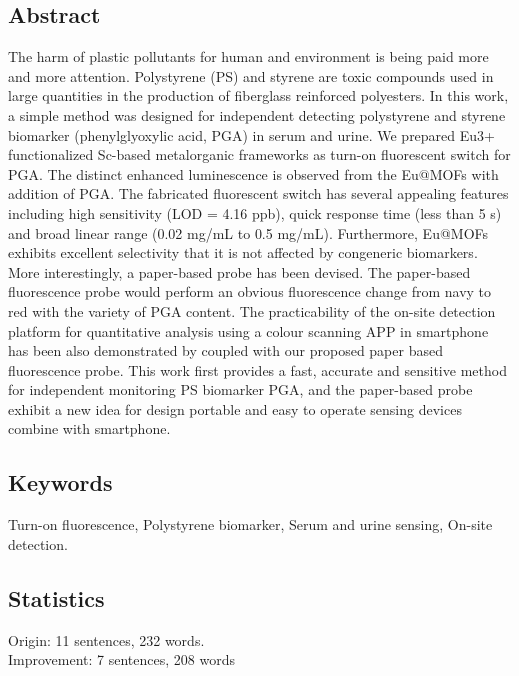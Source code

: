 \documentclass{article}
\begin{document}
\subsection{Abstract}
The harm of plastic pollutants for human and environment is being paid more and 
more attention. 
Polystyrene (PS) and styrene are toxic compounds used in large quantities in 
the production of fiberglass reinforced polyesters. 
In this work, a simple method was designed for independent detecting 
polystyrene and styrene biomarker (phenylglyoxylic acid, PGA) in serum and 
urine. 
We prepared Eu3+ functionalized Sc-based metalorganic frameworks as turn-on 
fluorescent switch for PGA. 
The distinct enhanced luminescence is observed from the Eu@MOFs with addition 
of PGA. 
The fabricated fluorescent switch has several appealing features including high 
sensitivity (LOD = 4.16 ppb), quick response time (less than 5 s) and broad 
linear range (0.02 mg/mL to 0.5 mg/mL). 
Furthermore, Eu@MOFs exhibits excellent selectivity that it is not affected by
congeneric biomarkers. 
More interestingly, a paper-based probe has been devised. 
The paper-based fluorescence probe would perform an obvious fluorescence change 
from navy to red with the variety of PGA content.
The practicability of the on-site detection platform for quantitative analysis 
using a colour scanning APP in smartphone has been also demonstrated by coupled 
with our proposed paper based fluorescence probe. 
This work first provides a fast, accurate and sensitive method for independent 
monitoring PS biomarker PGA, and the paper-based probe exhibit a new idea for 
design portable and easy to operate sensing devices combine with smartphone.

\subsection{Keywords}
Turn-on fluorescence,
Polystyrene biomarker,
Serum and urine sensing,
On-site detection.

\subsection{Statistics}
Origin: 11 sentences, 232 words.\\
Improvement: 7 sentences, 208 words
\end{document}
